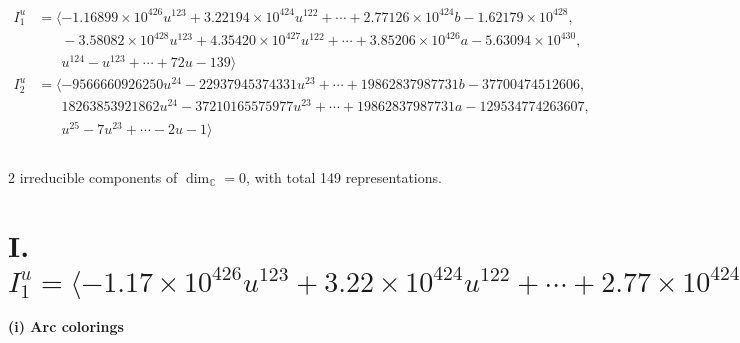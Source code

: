 \documentclass[1p]{elsarticle_modified}
\theoremstyle{definition}
\begin{document}
\begin{align*}
I^u_{1}&=\langle 
-1.16899\times10^{426} u^{123}+3.22194\times10^{424} u^{122}+\cdots+2.77126\times10^{424} b-1.62179\times10^{428},\\
\phantom{I^u_{1}}&\phantom{= \langle  }-3.58082\times10^{428} u^{123}+4.35420\times10^{427} u^{122}+\cdots+3.85206\times10^{426} a-5.63094\times10^{430},\\
\phantom{I^u_{1}}&\phantom{= \langle  }u^{124}- u^{123}+\cdots+72 u-139\rangle \\
I^u_{2}&=\langle 
-9566660926250 u^{24}-22937945374331 u^{23}+\cdots+19862837987731 b-37700474512606,\\
\phantom{I^u_{2}}&\phantom{= \langle  }18263853921862 u^{24}-37210165575977 u^{23}+\cdots+19862837987731 a-129534774263607,\\
\phantom{I^u_{2}}&\phantom{= \langle  }u^{25}-7 u^{23}+\cdots-2 u-1\rangle \\
\\
\end{align*}
\raggedright * 2 irreducible components of $\dim_{\mathbb{C}}=0$, with total 149 representations.\\
\newpage
\renewcommand{\arraystretch}{1}
\centering \section*{I. $I^u_{1}= \langle -1.17\times10^{426} u^{123}+3.22\times10^{424} u^{122}+\cdots+2.77\times10^{424} b-1.62\times10^{428},\;-3.58\times10^{428} u^{123}+4.35\times10^{427} u^{122}+\cdots+3.85\times10^{426} a-5.63\times10^{430},\;u^{124}- u^{123}+\cdots+72 u-139 \rangle$}
\flushleft \textbf{(i) Arc colorings}\\
\end{document}
